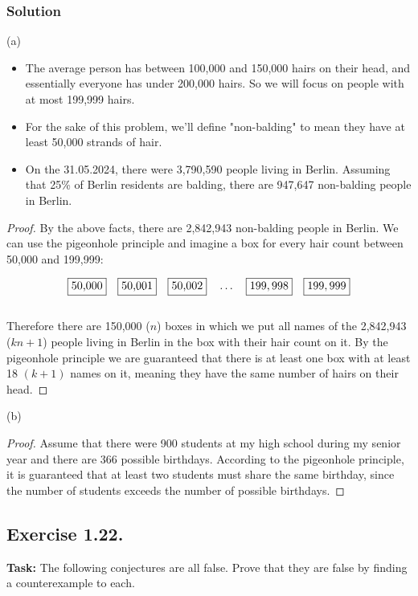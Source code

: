\documentclass{article}
\begin{document}
\subsubsection*{Solution} 

(a) 
\begin{itemize}
    \item The average person has between 100,000 and 150,000 hairs on their head, and essentially everyone has under 200,000 hairs. So we will focus on people with at most 199,999 hairs.
    \item For the sake of this problem, we'll define "non-balding" to mean they have at least 50,000 strands of hair.
    \item On the 31.05.2024, there were 3,790,590 people living in Berlin. Assuming that 25\% of Berlin residents are balding, there are 947,647 non-balding people in Berlin.
\end{itemize}

\begin{proof}
    By the above facts, there are 2,842,943 non-balding people in Berlin. We can use the pigeonhole principle and imagine a box for every hair count between 50,000 and 199,999:

     \[
    \fbox{50,000} \quad \fbox{50,001} \quad \fbox{50,002} \quad \dots \quad \fbox{$199,998$} \quad \fbox{$199,999$}
    \]\\

    Therefore there are 150,000 ($n$) boxes in which we put all names of the 2,842,943 ($kn+1$) people living in Berlin in the box with their hair count on it. By the pigeonhole principle we are guaranteed that there is at least one box with at least 18 $(k+1)$ names on it, meaning they have the same number of hairs on their head.

\end{proof}

\noindent (b)
\begin{proof} 
Assume that there were 900 students at my high school during my senior year and there are 366 possible birthdays. According to the pigeonhole principle, it is guaranteed that at least two students must share the same birthday, since the number of students exceeds the number of possible birthdays. 
\end{proof}

\newpage

\subsection{Exercise 1.22.} 
\textbf{Task:} The following conjectures are all false. Prove that they are false by finding a counterexample to each. \\
\end{document}
